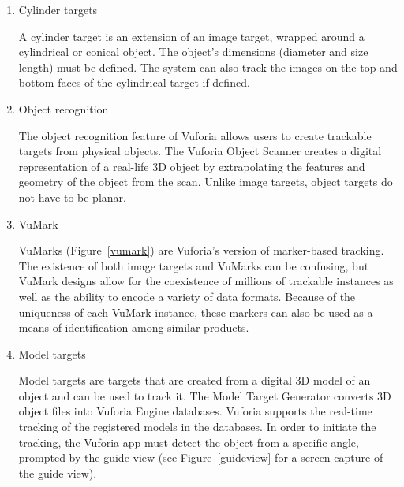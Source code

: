 \begin{enumerate}
\item Cylinder targets

A cylinder target is an extension of an image target, wrapped around a cylindrical or conical object. The object's dimensions (diameter and size length) must be defined. The system can also track the images on the top and bottom faces of the cylindrical target if defined.

\item Object recognition

The object recognition feature of Vuforia allows users to create trackable targets from physical objects. The Vuforia Object Scanner creates a digital representation of a real-life 3D object by extrapolating the features and geometry of the object from the scan. Unlike image targets, object targets do not have to be planar.

\item VuMark

\begin{figure}[!ht]
\end{figure}
\vspace{-.1 in}

VuMarks (Figure~\ref{vumark}) are Vuforia's version of marker-based tracking. The existence of both image targets and VuMarks can be confusing, but VuMark designs allow for the coexistence of millions of trackable instances as well as the ability to encode a variety of data formats. Because of the uniqueness of each VuMark instance, these markers can also be used as a means of identification among similar products.

\item Model targets

Model targets are targets that are created from a digital 3D model of an object and can be used to track it. The Model Target Generator converts 3D object files into Vuforia Engine databases. Vuforia supports the real-time tracking of the registered models in the databases. In order to initiate the tracking, the Vuforia app must detect the object from a specific angle, prompted by the guide view (see Figure~\ref{guideview} for a screen capture of the guide view).


\end{enumerate}
